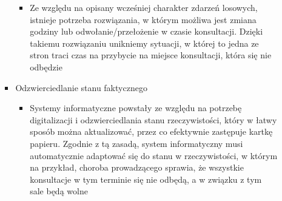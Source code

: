 \begin{enumerate}
\begin{itemize}
\begin{itemize}
\begin{itemize}
                        \item[] Ze względu na opisany wcześniej charakter zdarzeń losowych, istnieje potrzeba rozwiązania, w którym możliwa jest zmiana godziny lub odwołanie/przełożenie w czasie konsultacji. Dzięki takiemu rozwiązaniu unikniemy sytuacji, w której to jedna ze stron traci czas na przybycie na miejsce konsultacji, która się nie odbędzie 
                    \end{itemize}
                \item Odzwierciedlanie stanu faktycznego
                    \begin{itemize}
                        \item[] Systemy informatyczne powstały ze względu na potrzebę digitalizacji i odzwierciedlania stanu rzeczywistości, który w łatwy sposób można aktualizować, przez co efektywnie zastępuje kartkę papieru. Zgodnie z tą zasadą, system informatyczny musi automatycznie adaptować się do stanu w rzeczywistości, w którym na przykład, choroba prowadzącego sprawia, że wszystkie konsultacje w tym terminie się nie odbędą, a w związku z tym sale będą wolne
                    \end{itemize}
            \end{itemize}
        \end{itemize}
\end{enumerate}
\newpage
